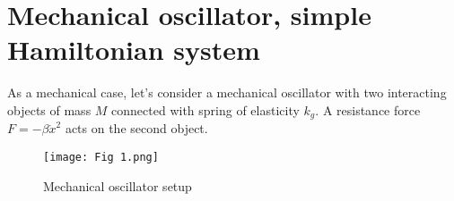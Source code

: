 \documentclass[]{article}
\title{}
\author{}
\begin{document}
\maketitle

\begin{abstract}

\end{abstract}

\section{Mechanical oscillator, simple Hamiltonian system}

As a mechanical case, let's consider a mechanical oscillator with two interacting objects of mass $M$ connected with spring of elasticity $k_g$. A resistance force $F = -\beta {\dot x}^2 $ acts on the second object.
\begin{figure}[h]
	\centering
	 \texttt{[image: Fig 1.png]}
	 \caption{Mechanical oscillator setup}
\end{figure}\newline
\end{document}
